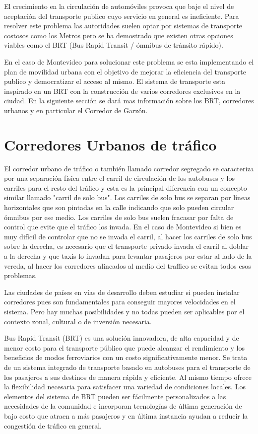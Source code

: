 El crecimiento en la circulación de automóviles provoca que baje el nivel de aceptación del transporte publico cuyo servicio en general es ineficiente. Para resolver este problema las autoridades suelen optar por sistemas de transporte costosos como los Metros pero se ha demostrado que existen otras opciones viables como el BRT (Bus Rapid Transit / ómnibus de tránsito rápido).\citep{BRT_Dial} 

En el caso de Montevideo para solucionar este problema se esta implementando el plan de movilidad urbana \citep{PlanMovilidad} con el objetivo de mejorar la eficiencia del transporte publico y democratizar el acceso al mismo. El sistema de transporte esta inspirado en un BRT con la construcción de varios corredores exclusivos en la ciudad. En la siguiente sección se dará mas información sobre los BRT, corredores urbanos y en particular el Corredor de Garzón.



\section{Corredores Urbanos de tráfico}

El corredor urbano de tráfico o también llamado corredor segregado se caracteriza por una separación física entre el carril de circulación de los autobuses y los carriles para el resto del tráfico y esta es la principal diferencia con un concepto similar llamado "carril de solo bus". Los carriles de solo bus se separan por líneas horizontales que son pintadas en la calle indicando que solo pueden circular ómnibus por ese medio. Los carriles de solo bus suelen fracasar por falta de control que evite que el tráfico los invada. En el caso de Montevideo si bien es muy difícil de controlar que no se invada el carril, al hacer los carriles de solo bus sobre la derecha, es necesario que el transporte privado invada el carril al doblar a la derecha y que taxis lo invadan para levantar pasajeros por estar al lado de la vereda, al hacer los corredores alineados al medio del traffico se evitan todos esos problemas.  

Las ciudades de países en vías de desarrollo deben estudiar si pueden instalar corredores pues son fundamentales para conseguir mayores velocidades en el sistema. Pero hay muchas posibilidades y no todas pueden ser aplicables por el contexto zonal, cultural o de inversión necesaria.

Bus Rapid Transit (BRT) es una solución innovadora, de alta capacidad y de menor costo para el transporte público que puede alcanzar el rendimiento y los beneficios de modos ferroviarios con un costo significativamente menor. Se trata de un sistema integrado de transporte basado en autobuses para el transporte de los pasajeros a sus destinos de manera rápida y eficiente. Al mismo tiempo ofrece la flexibilidad necesaria para satisfacer una variedad de condiciones locales. Los elementos del sistema de BRT pueden ser fácilmente personalizados a las necesidades de la comunidad e incorporan tecnologías de última generación de bajo costo que atraen a más pasajeros y en última instancia ayudan a reducir la congestión de tráfico en general.

